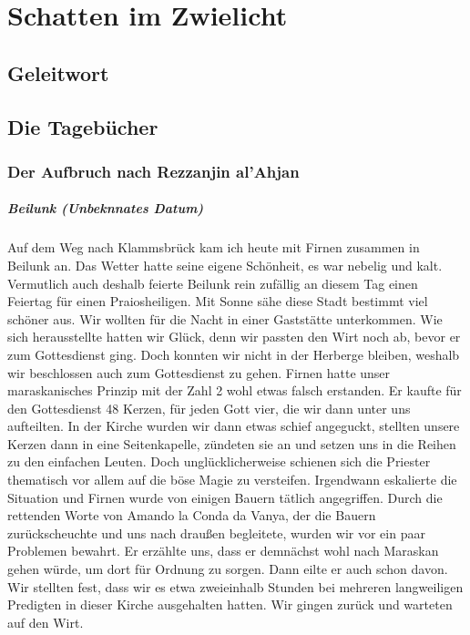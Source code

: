 \chapter{Schatten im Zwielicht}

\section{Geleitwort}

\section{Die Tagebücher}

\subsection{Der Aufbruch nach Rezzanjin al'Ahjan}

\paragraph{Beilunk (Unbeknnates Datum)}
Auf dem Weg nach Klammsbrück kam ich heute mit Firnen zusammen in Beilunk an. Das Wetter hatte seine eigene Schönheit, es war nebelig und kalt. Vermutlich auch deshalb feierte Beilunk rein zufällig an diesem Tag einen Feiertag für einen Praiosheiligen. Mit Sonne sähe diese Stadt bestimmt viel schöner aus. Wir wollten für die Nacht in einer Gaststätte unterkommen. Wie sich herausstellte hatten wir Glück, denn wir passten den Wirt noch ab, bevor er zum Gottesdienst ging. Doch konnten wir nicht in der Herberge bleiben, weshalb wir beschlossen auch zum Gottesdienst zu gehen. Firnen hatte unser maraskanisches Prinzip mit der Zahl 2 wohl etwas falsch erstanden. Er kaufte für den Gottesdienst 48 Kerzen, für jeden Gott vier, die wir dann unter uns aufteilten. In der Kirche wurden wir dann etwas schief angeguckt, stellten unsere Kerzen dann in eine Seitenkapelle, zündeten sie an und setzen uns in die Reihen zu den einfachen Leuten. Doch unglücklicherweise schienen sich die Priester thematisch vor allem auf die böse Magie zu versteifen. Irgendwann eskalierte die Situation und Firnen wurde von einigen Bauern tätlich angegriffen. Durch die rettenden Worte von Amando la Conda da Vanya, der die Bauern zurückscheuchte und uns nach draußen begleitete, wurden wir vor ein paar Problemen bewahrt. Er erzählte uns, dass er demnächst wohl nach Maraskan gehen würde, um dort für Ordnung zu sorgen. Dann eilte er auch schon davon. Wir stellten fest, dass wir es etwa zweieinhalb Stunden bei mehreren langweiligen Predigten in dieser Kirche ausgehalten hatten. Wir gingen zurück und warteten auf den Wirt.


